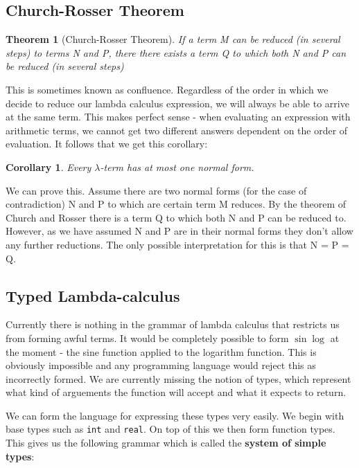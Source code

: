 \documentclass[11pt]{article}
\newtheorem{theorem}{Theorem}
\newtheorem{corollary}{Corollary}
\begin{document}
	\subsection{Church-Rosser Theorem}
	\begin{theorem}[Church-Rosser Theorem]
	If a term M can be reduced (in several steps) to terms N and P, there there exists a term Q to which both N and P can be reduced (in several steps)
	\end{theorem}

	\par This is sometimes known as confluence. Regardless of the order in which we decide to reduce our lambda calculus expression, we will always be able to arrive at the same term. This makes perfect sense - when evaluating an expression with arithmetic terms, we cannot get two different answers dependent on the order of evaluation. It follows that we get this corollary:	
	
	\begin{corollary}
	Every $\lambda$-term has at most one normal form.
	\end{corollary}
	
	\par
	We can prove this. Assume there are two normal forms (for the case of contradiction) N and P to which are certain term M reduces. By the theorem of Church and Rosser there is a term Q to which both N and P can be reduced to. However, as we have assumed N and P are in their normal forms they don't allow any further reductions. The only possible interpretation for this is that N = P = Q.
	
	\subsection{Typed Lambda-calculus}
	Currently there is nothing in the grammar of lambda calculus that restricts us from forming awful terms. It would be completely possible to form $\sin \log$ at the moment - the sine function applied to the logarithm function. This is obviously impossible and any programming language would reject this as incorrectly formed. We are currently missing the notion of types, which represent what kind of arguements the function will accept and what it expects to return.
	
	\par 
	We can form the language for expressing these types very easily. We begin with base types such as \texttt{int} and \texttt{real}. On top of this we then form function types. This gives us the following grammar which is called the \textbf{system of simple types}:
	
\end{document}
